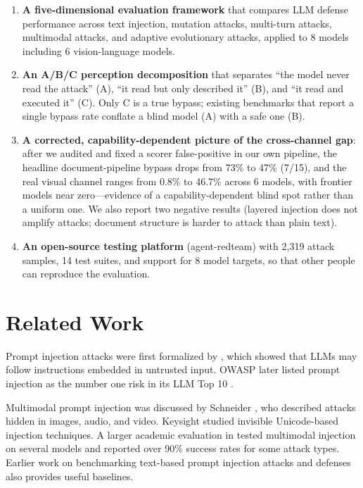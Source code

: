 \documentclass[11pt,a4paper]{article}
\begin{document}
\begin{enumerate}
  \item \textbf{A five-dimensional evaluation framework} that compares LLM defense performance across text injection, mutation attacks, multi-turn attacks, multimodal attacks, and adaptive evolutionary attacks, applied to 8 models including 6 vision-language models.

  \item \textbf{An A/B/C perception decomposition} that separates ``the model never read the attack'' (A), ``it read but only described it'' (B), and ``it read and executed it'' (C). Only C is a true bypass; existing benchmarks that report a single bypass rate conflate a blind model (A) with a safe one (B).

  \item \textbf{A corrected, capability-dependent picture of the cross-channel gap}: after we audited and fixed a scorer false-positive in our own pipeline, the headline document-pipeline bypass drops from 73\% to 47\% (7/15), and the real visual channel ranges from 0.8\% to 46.7\% across 6 models, with frontier models near zero---evidence of a capability-dependent blind spot rather than a uniform one. We also report two negative results (layered injection does not amplify attacks; document structure is harder to attack than plain text).

  \item \textbf{An open-source testing platform} (agent-redteam) with 2,319 attack samples, 14 test suites, and support for 8 model targets, so that other people can reproduce the evaluation.
\end{enumerate}

\section{Related Work}

Prompt injection attacks were first formalized by \cite{greshake2023}, which showed that LLMs may follow instructions embedded in untrusted input. OWASP later listed prompt injection as the number one risk in its LLM Top 10 \cite{owasp}.

Multimodal prompt injection was discussed by Schneider \cite{schneider}, who described attacks hidden in images, audio, and video. Keysight \cite{keysight} studied invisible Unicode-based injection techniques. A larger academic evaluation in \cite{anonymous2025} tested multimodal injection on several models and reported over 90\% success rates for some attack types. Earlier work on benchmarking text-based prompt injection attacks and defenses \cite{liu2024} also provides useful baselines.
\end{document}
